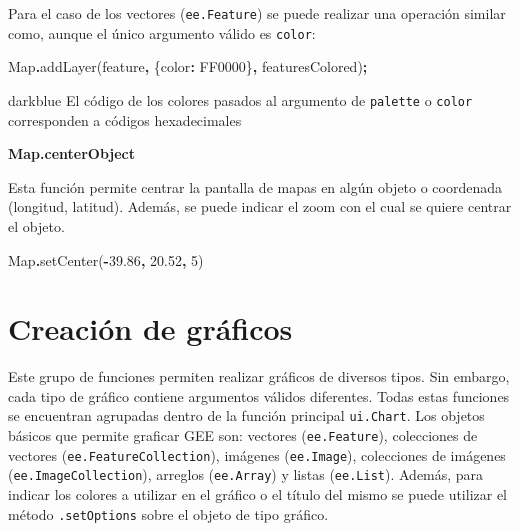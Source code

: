 \documentclass[
  12pt,
  letterpaper,
  twoside]{book}
\newenvironment{Shaded}{\begin{snugshade}}{\end{snugshade}}
\newcommand{\BuiltInTok}[1]{#1}
\newcommand{\DataTypeTok}[1]{\textcolor[rgb]{0.13,0.29,0.53}{#1}}
\newcommand{\DecValTok}[1]{\textcolor[rgb]{0.00,0.00,0.81}{#1}}
\newcommand{\FloatTok}[1]{\textcolor[rgb]{0.00,0.00,0.81}{#1}}
\newcommand{\FunctionTok}[1]{\textcolor[rgb]{0.00,0.00,0.00}{#1}}
\newcommand{\NormalTok}[1]{#1}
\newcommand{\OperatorTok}[1]{\textcolor[rgb]{0.81,0.36,0.00}{\textbf{#1}}}
\newcommand{\StringTok}[1]{\textcolor[rgb]{0.31,0.60,0.02}{#1}}
\begin{document}
Para el caso de los vectores (\texttt{ee.Feature}) se puede realizar una operación similar como, aunque el único argumento válido es \texttt{color}:

\begin{Shaded}
\begin{Highlighting}[]
\BuiltInTok{Map}\OperatorTok{.}\FunctionTok{addLayer}\NormalTok{(feature}\OperatorTok{,}\NormalTok{ \{}\DataTypeTok{color}\OperatorTok{:} \StringTok{\textquotesingle{}FF0000\textquotesingle{}}\NormalTok{\}}\OperatorTok{,} \StringTok{\textquotesingle{}featuresColored\textquotesingle{}}\NormalTok{)}\OperatorTok{;}
\end{Highlighting}
\end{Shaded}

\begin{bluebox2}

\begin{awesomeblock}{5pt}{\faLightbulb}{darkblue}
El código de los colores pasados al argumento de \texttt{palette} o \texttt{color} corresponden a códigos hexadecimales

\end{awesomeblock}

\end{bluebox2}

\textbf{Map.centerObject}

Esta función permite centrar la pantalla de mapas en algún objeto o coordenada (longitud, latitud). Además, se puede indicar el zoom con el cual se quiere centrar el objeto.

\begin{Shaded}
\begin{Highlighting}[]
\BuiltInTok{Map}\OperatorTok{.}\FunctionTok{setCenter}\NormalTok{(}\OperatorTok{{-}}\FloatTok{39.86}\OperatorTok{,} \FloatTok{20.52}\OperatorTok{,} \DecValTok{5}\NormalTok{)}
\end{Highlighting}
\end{Shaded}

\hypertarget{creaciuxf3n-de-gruxe1ficos}{%
\section{Creación de gráficos}\label{creaciuxf3n-de-gruxe1ficos}}

Este grupo de funciones permiten realizar gráficos de diversos tipos. Sin embargo, cada tipo de gráfico contiene argumentos válidos diferentes. Todas estas funciones se encuentran agrupadas dentro de la función principal \texttt{ui.Chart}. Los objetos básicos que permite graficar GEE son: vectores (\texttt{ee.Feature}), colecciones de vectores (\texttt{ee.FeatureCollection}), imágenes (\texttt{ee.Image}), colecciones de imágenes (\texttt{ee.ImageCollection}), arreglos (\texttt{ee.Array}) y listas (\texttt{ee.List}). Además, para indicar los colores a utilizar en el gráfico o el título del mismo se puede utilizar el método \texttt{.setOptions} sobre el objeto de tipo gráfico.
\end{document}
